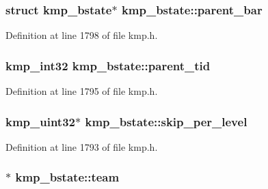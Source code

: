 \hypertarget{structkmp__bstate_a908f228353bb5b8f94d3eb20ad82473c}{
\subsubsection[{parent\-\_\-bar}]{\setlength{\rightskip}{0pt plus 5cm}struct {\bf kmp\-\_\-bstate}$\ast$ kmp\-\_\-bstate\-::parent\-\_\-bar}}\label{structkmp__bstate_a908f228353bb5b8f94d3eb20ad82473c}


Definition at line 1798 of file kmp.\-h.

\hypertarget{structkmp__bstate_afb96816855880f714bba4f2162408ff8}{
\subsubsection[{parent\-\_\-tid}]{\setlength{\rightskip}{0pt plus 5cm}kmp\-\_\-int32 kmp\-\_\-bstate\-::parent\-\_\-tid}}\label{structkmp__bstate_afb96816855880f714bba4f2162408ff8}


Definition at line 1795 of file kmp.\-h.

\hypertarget{structkmp__bstate_a0f3bfc82949c603682000e6582cadcf4}{
\subsubsection[{skip\-\_\-per\-\_\-level}]{\setlength{\rightskip}{0pt plus 5cm}kmp\-\_\-uint32$\ast$ kmp\-\_\-bstate\-::skip\-\_\-per\-\_\-level}}\label{structkmp__bstate_a0f3bfc82949c603682000e6582cadcf4}


Definition at line 1793 of file kmp.\-h.

\hypertarget{structkmp__bstate_a8980b8fa3491df30edcc2d53a17a77e2}{
\subsubsection[{team}]{$\ast$ kmp\-\_\-bstate\-::team}}\label{structkmp__bstate_a8980b8fa3491df30edcc2d53a17a77e2}


